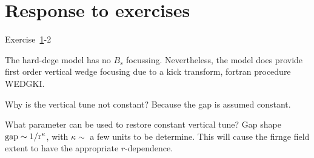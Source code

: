\section{Response to exercises \label{secFFAGExResp}}

\noindent {\small $\bullet$} Exercise~\ref{}-2 

The hard-dege model has no $B_s$ focussing. Nevertheless, the model 
does provide first order vertical wedge focusing due to a kick transform, fortran procedure \textrm{WEDGKI}. 

Why is the vertical tune not constant? Because the gap is assumed constant.

What parameter can be used to restore constant vertical tune? Gap shape $\rm gap \sim 1/r^{\kappa}$, 
with $\kappa\sim$ a few units to be determine. This will cause the firnge field 
extent to have the appropriate $r$-dependence. 
